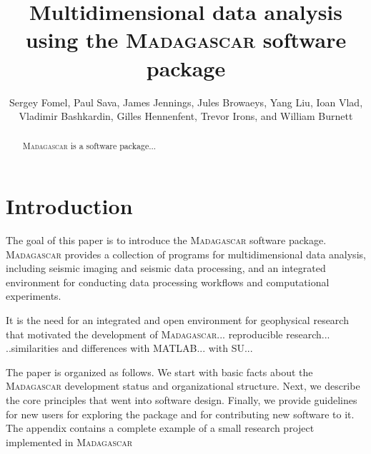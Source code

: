 \title{Multidimensional data analysis \\ using the \textsc{Madagascar} software package}

\renewcommand{\thefootnote}{\fnsymbol{footnote}} 

\author{Sergey Fomel\footnotemark[1], Paul Sava\footnotemark[2], James Jennings, Jules Browaeys, Yang Liu\footnotemark[1], Ioan Vlad, Vladimir Bashkardin\footnotemark[1],  Gilles Hennenfent, Trevor Irons\footnotemark[2], and William Burnett\footnotemark[1]}


\address{
\footnotemark[1]Bureau of Economic Geology, \\
John A. and Katherine G. Jackson School of Geosciences \\
The University of Texas at Austin \\
University Station, Box X \\
Austin, TX 78713-8972 \\
\footnotemark[2] Department of Geophysics \\
Colorado School of Mines \\
Golden, CO 80401}


\maketitle

\begin{abstract}
  \textsc{Madagascar} is a software package...
\end{abstract}

\section{Introduction}

The goal of this paper is to introduce the \textsc{Madagascar}
software package. \textsc{Madagascar} provides a collection of
programs for multidimensional data analysis, including seismic imaging
and seismic data processing, and an integrated environment for
conducting data processing workflows and computational experiments.

It is the need for an integrated and open environment for geophysical
research that motivated the development of
\textsc{Madagascar}... reproducible research... ..similarities and
differences with MATLAB... with SU...

The paper is organized as follows. We start with basic facts about the
\textsc{Madagascar} development status and organizational
structure. Next, we describe the core principles that went into
software design. Finally, we provide guidelines for new users for
exploring the package and for contributing new software to it. The
appendix contains a complete example of a small research project
implemented in \textsc{Madagascar}

